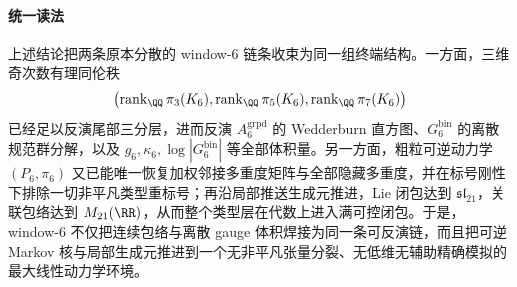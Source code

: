\paragraph{统一读法}
上述结论把两条原本分散的 window-\(6\) 链条收束为同一组终端结构。一方面，三维奇次数有理同伦秩
\[
\bigl(\operatorname{rank}_{\QQ}\pi_3(K_6),\operatorname{rank}_{\QQ}\pi_5(K_6),\operatorname{rank}_{\QQ}\pi_7(K_6)\bigr)
\]
已经足以反演尾部三分层，进而反演 \(A_6^{\mathrm{grpd}}\) 的 Wedderburn 直方图、\(G_6^{\mathrm{bin}}\) 的离散规范群分解，以及 \(g_6,\kappa_6,\log|G_6^{\mathrm{bin}}|\) 等全部体积量。另一方面，粗粒可逆动力学 \((P_6,\pi_6)\) 又已能唯一恢复加权邻接多重度矩阵与全部隐藏多重度，并在标号刚性下排除一切非平凡类型重标号；再沿局部推送生成元推进，Lie 闭包达到 \(\mathfrak{sl}_{21}\)，关联包络达到 \(M_{21}(\RR)\)，从而整个类型层在代数上进入满可控闭包。于是，window-\(6\) 不仅把连续包络与离散 gauge 体积焊接为同一条可反演链，而且把可逆 Markov 核与局部生成元推进到一个无非平凡张量分裂、无低维无辅助精确模拟的最大线性动力学环境。

\endinput
